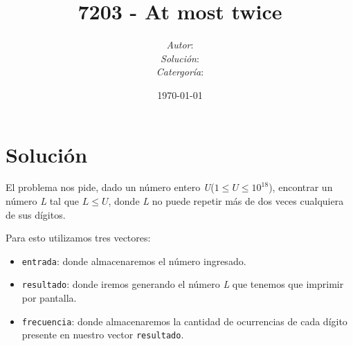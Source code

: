 \documentclass[10pt,a4paper,oneside]{article}
\title{7203 - At most twice}
\author{ 
	\small\emph{Autor}: \authorproblem\\ 
	\small\emph{Soluci\'on}: \authorsolution\\
	\small\emph{Catergor\'ia}: \problemtype
}
\date{\today}
\begin{document}
\maketitle

\section*{Soluci\'on}

El problema nos pide, dado un n\'umero entero \textit{U}($1\leq U \leq 10^{18}$), encontrar un n\'umero \textit{L} tal que $L \leq U$, donde \textit{L} no puede repetir m\'as de dos veces cualquiera de sus d\'igitos.

Para esto utilizamos tres vectores:
\begin{itemize}
    \item \texttt{entrada}: donde almacenaremos el n\'umero ingresado. 
    \item \texttt{resultado}: donde iremos generando el n\'umero \textit{L} que tenemos que imprimir por pantalla.
    \item \texttt{frecuencia}: donde almacenaremos la cantidad de ocurrencias de cada d\'igito presente en nuestro vector \texttt{resultado}.
\end{itemize}
\end{document}
